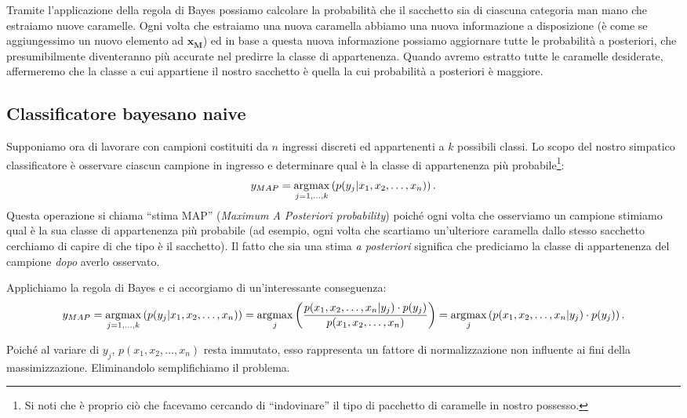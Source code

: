 Tramite l'applicazione della regola di Bayes possiamo calcolare la probabilità che il sacchetto sia di ciascuna categoria man mano che estraiamo nuove caramelle. Ogni volta che estraiamo una nuova caramella abbiamo una nuova informazione a disposizione (è come se aggiungessimo un nuovo elemento ad $\mathbf{x_M}$) ed in base a questa nuova informazione possiamo aggiornare tutte le probabilità a posteriori, che presumibilmente diventeranno più accurate nel predirre la classe di appartenenza. Quando avremo estratto tutte le caramelle desiderate, affermeremo che la classe a cui appartiene il nostro sacchetto è quella la cui probabilità a posteriori è maggiore.

\subsection{Classificatore bayesano naive}
Supponiamo ora di lavorare con campioni costituiti da $n$ ingressi discreti ed appartenenti a $k$ possibili classi. Lo scopo del nostro simpatico classificatore è osservare ciascun campione in ingresso e determinare qual è la classe di appartenenza più probabile\footnote{Si noti che è proprio ciò che facevamo cercando di ``indovinare'' il tipo di pacchetto di caramelle in nostro possesso.}:
\begin{equation*}
y_{MAP} = \operatorname*{arg\!\max}_{j = 1, \dots, k} \left( p(y_j|x_1,x_2,\dots,x_n) \right).
\end{equation*}
Questa operazione si chiama ``stima MAP'' (\emph{Maximum A Posteriori probability}) poiché ogni volta che osserviamo un campione stimiamo qual è la sua classe di appartenenza più probabile (ad esempio, ogni volta che scartiamo un'ulteriore caramella dallo stesso sacchetto cerchiamo di capire di che tipo è il sacchetto). Il fatto che sia una stima \emph{a posteriori} significa che prediciamo la classe di appartenenza del campione \emph{dopo} averlo osservato.

Applichiamo la regola di Bayes e ci accorgiamo di un'interessante conseguenza:
\begin{dmath*}
y_{MAP} = \argmax_{j = 1, \dots, k} \left( p(y_j|x_1,x_2,\dots,x_n) \right)
= \argmax_{j} \left( \frac{p(x_1,x_2,\dots,x_n | y_j)\cdot p(y_j)}{p(x_1,x_2,\dots,x_n)} \right)
= \argmax_{j} \left( p(x_1,x_2,\dots,x_n | y_j)\cdot p(y_j) \right).
\end{dmath*}

Poiché al variare di $y_j$, ${p(x_1,x_2,\dots,x_n)}$ resta immutato, esso rappresenta un fattore di normalizzazione non influente ai fini della massimizzazione. Eliminandolo semplifichiamo il problema.

